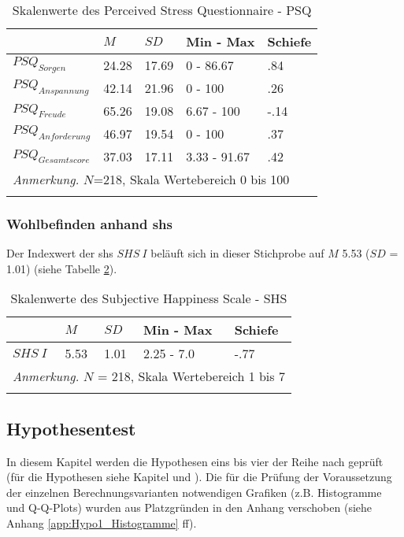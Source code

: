 \begin{table}[ht]
\begin{tabular}{m{6em} m{3em}  m{3em}  m{5em} m{3em}} 
  \hline
  & $M$ & $SD$ & Min - Max & Schiefe\\
  \hline
  $PSQ_{Sorgen}$ & 24.28 & 17.69 & 0 - 86.67 & .84 \\
  $PSQ_{Anspannung}$ & 42.14 & 21.96 & 0 - 100 & .26\\
  $PSQ_{Freude}$ & 65.26 & 19.08 & 6.67 - 100 & -.14\\
  $PSQ_{Anforderung}$ & 46.97 & 19.54 & 0 - 100 & .37 \\
  $PSQ_{Gesamtscore}$ & 37.03 & 17.11 & 3.33 - 91.67 & .42\\
  \hline
  \multicolumn{5}{l}{\textit{Anmerkung.} $N$=218, Skala Wertebereich 0 bis 100}\\
  &&&&\\
\end{tabular}
\caption{Skalenwerte des Perceived Stress Questionnaire - PSQ}
\label{table:PSQDeskriptiv}
\end{table}


\subsubsection{Wohlbefinden anhand \acrshort{shs}}
Der Indexwert der \acrfull{shs} $SHS~I$ beläuft sich in dieser Stichprobe auf $M$ 5.53 ($SD$ = 1.01) (siehe Tabelle \ref{table:SHSDeskriptiv}).

\begin{table}[ht]
\begin{tabular}{m{6em} m{3em}  m{3em}  m{5em} m{3em}} 
  \hline
  & $M$ & $SD$ & Min - Max & Schiefe\\
  \hline
  $SHS~I$ & 5.53 & 1.01 & 2.25 - 7.0 & -.77 \\
  \hline
  \multicolumn{5}{l}{\textit{Anmerkung.} $N$ = 218, Skala Wertebereich 1 bis 7}\\
  &&&&\\
\end{tabular}
\caption{Skalenwerte des Subjective Happiness Scale - SHS}
\label{table:SHSDeskriptiv}
\end{table}

\subsection{Hypothesentest} \label{sec:Hypothesentest}
In diesem Kapitel werden die Hypothesen eins bis vier der Reihe nach geprüft (für die Hypothesen siehe Kapitel \textit{} und \textit{}). Die für die Prüfung der Voraussetzung der einzelnen Berechnungsvarianten notwendigen Grafiken (z.B. Histogramme und Q-Q-Plots) wurden aus Platzgründen in den Anhang verschoben (siehe Anhang \ref{app:Hypo1_Histogramme} ff).

